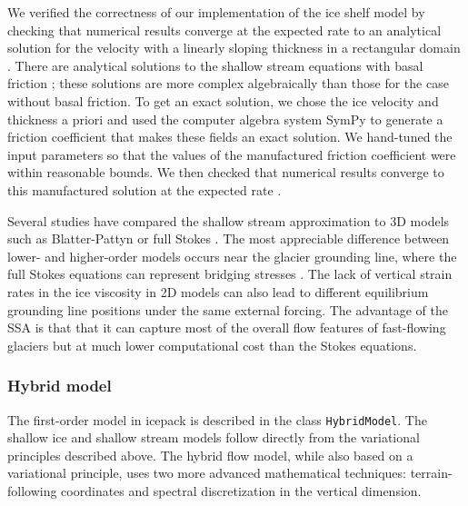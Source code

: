 \documentclass[journal abbreviation, manuscript]{copernicus}
\begin{document}
We verified the correctness of our implementation of the ice shelf model by checking that numerical results converge at the expected rate to an analytical solution for the velocity with a linearly sloping thickness in a rectangular domain \citep{greve2009dynamics}.
There are analytical solutions to the shallow stream equations with basal friction \citep{bodhvarsson1955flow, bueler2014exact}; these solutions are more complex algebraically than those for the case without basal friction.
To get an exact solution, we chose the ice velocity and thickness a priori and used the computer algebra system SymPy \citep{sympy} to generate a friction coefficient that makes these fields an exact solution.
We hand-tuned the input parameters so that the values of the manufactured friction coefficient were within reasonable bounds.
We then checked that numerical results converge to this manufactured solution at the expected rate \citep{roache2002code}.

Several studies have compared the shallow stream approximation to 3D models such as Blatter-Pattyn or full Stokes \citep{pattyn2013grounding}.
The most appreciable difference between lower- and higher-order models occurs near the glacier grounding line, where the full Stokes equations can represent bridging stresses \citep{van2013fundamentals}.
The lack of vertical strain rates in the ice viscosity in 2D models can also lead to different equilibrium grounding line positions under the same external forcing.
The advantage of the SSA is that that it can capture most of the overall flow features of fast-flowing glaciers but at much lower computational cost than the Stokes equations.


\subsubsection{Hybrid model} \label{sec:physics-hybrid-model}

The first-order model in icepack is described in the class \texttt{HybridModel}.
The shallow ice and shallow stream models follow directly from the variational principles described above.
The hybrid flow model, while also based on a variational principle, uses two more advanced mathematical techniques: terrain-following coordinates and spectral discretization in the vertical dimension.
\end{document}
